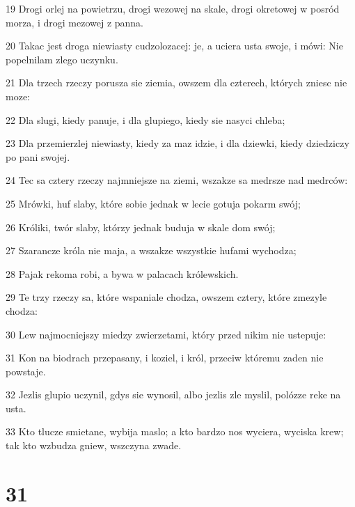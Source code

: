 \par 19 Drogi orlej na powietrzu, drogi wezowej na skale, drogi okretowej w posród morza, i drogi mezowej z panna.
\par 20 Takac jest droga niewiasty cudzolozacej: je, a uciera usta swoje, i mówi: Nie popelnilam zlego uczynku.
\par 21 Dla trzech rzeczy porusza sie ziemia, owszem dla czterech, których zniesc nie moze:
\par 22 Dla slugi, kiedy panuje, i dla glupiego, kiedy sie nasyci chleba;
\par 23 Dla przemierzlej niewiasty, kiedy za maz idzie, i dla dziewki, kiedy dziedziczy po pani swojej.
\par 24 Tec sa cztery rzeczy najmniejsze na ziemi, wszakze sa medrsze nad medrców:
\par 25 Mrówki, huf slaby, które sobie jednak w lecie gotuja pokarm swój;
\par 26 Króliki, twór slaby, którzy jednak buduja w skale dom swój;
\par 27 Szarancze króla nie maja, a wszakze wszystkie hufami wychodza;
\par 28 Pajak rekoma robi, a bywa w palacach królewskich.
\par 29 Te trzy rzeczy sa, które wspaniale chodza, owszem cztery, które zmezyle chodza:
\par 30 Lew najmocniejszy miedzy zwierzetami, który przed nikim nie ustepuje:
\par 31 Kon na biodrach przepasany, i koziel, i król, przeciw któremu zaden nie powstaje.
\par 32 Jezlis glupio uczynil, gdys sie wynosil, albo jezlis zle myslil, polózze reke na usta.
\par 33 Kto tlucze smietane, wybija maslo; a kto bardzo nos wyciera, wyciska krew; tak kto wzbudza gniew, wszczyna zwade.

\chapter{31}

